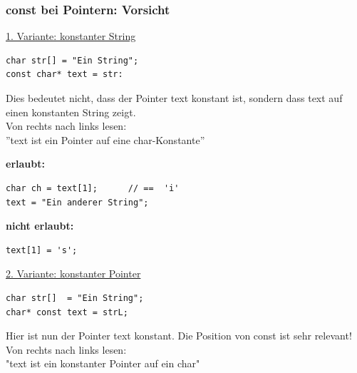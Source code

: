\subsubsection{const bei Pointern: Vorsicht}
\underline{1. Variante: konstanter String}\\
\noindent
\begin{minipage}{0.35\linewidth}
\begin{lstlisting}
char str[] = "Ein String";
const char* text = str:
\end{lstlisting}
\end{minipage}
\hspace{0.01\linewidth}
\begin{minipage}{0.6\linewidth}
	Dies bedeutet nicht, dass der Pointer text konstant ist, sondern dass text auf einen konstanten String zeigt.\\
	Von rechts nach links lesen:\\ ''text ist ein Pointer auf eine char-Konstante''
\end{minipage}

\noindent
\begin{minipage}{0.45\linewidth}
\textbf{erlaubt:}
\vspace{-\baselineskip}
\begin{lstlisting}
char ch = text[1];		// ==  'i'
text = "Ein anderer String";
\end{lstlisting}
\end{minipage}
\hspace{0.01\linewidth}
\begin{minipage}{0.2\linewidth}
\textbf{nicht erlaubt:}
\vspace{-\baselineskip}
\begin{lstlisting}
text[1] = 's';
\end{lstlisting}
\vfill\null
\end{minipage}

\underline{2. Variante: konstanter Pointer}\\
\noindent
\begin{minipage}{0.4\linewidth}
\vspace{-\baselineskip}
\begin{lstlisting}
char str[]  = "Ein String";
char* const text = strL;
\end{lstlisting}
\end{minipage}
\hspace{0.01\linewidth}
\begin{minipage}{0.6\linewidth}
Hier ist nun der Pointer text konstant. Die Position von const ist sehr relevant!\\
Von rechts nach links lesen:\\ "text ist ein konstanter Pointer auf ein char"
\end{minipage}

